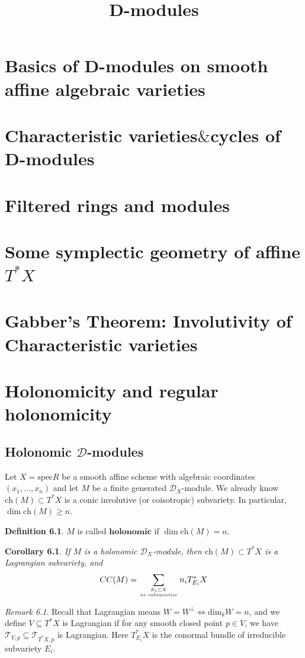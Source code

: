 \documentclass[openany]{book}
\title{D-modules}
\newtheorem{corollary}[theorem]{Corollary}   %
\theoremstyle{definition} %
\newtheorem{definition}[theorem]{Definition} %
\theoremstyle{remark}
\newtheorem{remark}{Remark}[chapter] %
\begin{document}
\maketitle
\tableofcontents
\chapter{Basics of D-modules on smooth affine algebraic varieties}
\chapter{Characteristic varieties$\&$cycles of D-modules}
\chapter{Filtered rings and modules}
\chapter{Some symplectic geometry of affine $T^{\ast}X$}
\chapter{Gabber’s Theorem: Involutivity of Characteristic varieties}
\chapter{Holonomicity and regular holonomicity}
\section{Holonomic $\mathcal{D}$-modules}
Let $X = \text{spec} R$ be a smooth affine scheme with algebraic coordinates $(x_1, \ldots, x_n)$ and let $M$ be a finite generated $\mathcal{D}_X$-module. We already know $\text{ch}(M) \subset T^*X$ is a conic involutive (or coisotropic) subvariety. In particular, $\dim \text{ch}(M) \geq n$.

\begin{definition}
    $M$ is called $\textbf{holonomic}$ if $\dim \text{ch}(M) = n$.
\end{definition}

\begin{corollary}
    If $M$ is a holonomic $\mathcal{D}_X$-module, then $\text{ch}(M) \subset T^*X$ is a Lagrangian subvariety, and $$CC(M) = \sum_{E_i \subset X\atop \text{irr subvarieties}} n_i T^*_{E_i} X$$
\end{corollary}

\begin{remark}
    Recall that Lagrangian means $W=W^{\perp}\iff \mathrm{dim}_{k}W=n$, and we define $V\subseteq T^{\ast}X$ is Lagrangian if for any smooth closed point $p\in V$, we have $\mathcal{T}_{V,p}\subseteq \mathcal{T}_{T^{\ast}X,p}$ is Lagrangian. Here $T^{\ast}_{E_{i}}X$ is the conormal bundle of irreducible subvariety $E_{i}$.
\end{remark}
\end{document}
